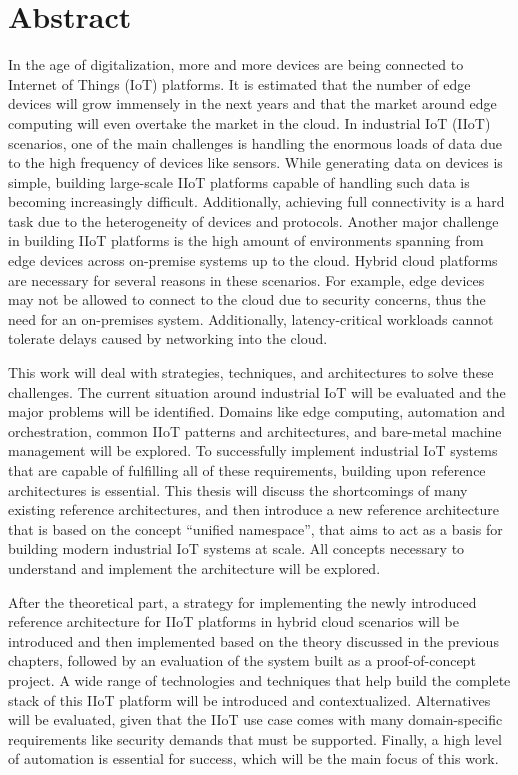 \chapter*{Abstract}

In the age of digitalization, more and more devices are being connected to Internet of Things (IoT) platforms. It is estimated that the number of edge devices will grow immensely in the next years and that the market around edge computing will even overtake the market in the cloud. In industrial IoT (IIoT) scenarios, one of the main challenges is handling the enormous loads of data due to the high frequency of devices like sensors. While generating data on devices is simple, building large-scale IIoT platforms capable of handling such data is becoming increasingly difficult. Additionally, achieving full connectivity is a hard task due to the heterogeneity of devices and protocols. Another major challenge in building IIoT platforms is the high amount of environments spanning from edge devices across on-premise systems up to the cloud. Hybrid cloud platforms are necessary for several reasons in these scenarios. For example, edge devices may not be allowed to connect to the cloud due to security concerns, thus the need for an on-premises system. Additionally, latency-critical workloads cannot tolerate delays caused by networking into the cloud. 

This work will deal with strategies, techniques, and architectures to solve these challenges. The current situation around industrial IoT will be evaluated and the major problems will be identified. Domains like edge computing, automation and orchestration, common IIoT patterns and architectures, and bare-metal machine management will be explored. To successfully implement industrial IoT systems that are capable of fulfilling all of these requirements, building upon reference architectures is essential. This thesis will discuss the shortcomings of many existing reference architectures, and then introduce a new reference architecture that is based on the concept ``unified namespace'', that aims to act as a basis for building modern industrial IoT systems at scale. All concepts necessary to understand and implement the architecture will be explored.

After the theoretical part, a strategy for implementing the newly introduced reference architecture for IIoT platforms in hybrid cloud scenarios will be introduced and then implemented based on the theory discussed in the previous chapters, followed by an evaluation of the system built as a proof-of-concept project. A wide range of technologies and techniques that help build the complete stack of this IIoT platform will be introduced and contextualized. Alternatives will be evaluated, given that the IIoT use case comes with many domain-specific requirements like security demands that must be supported. Finally, a  high level of automation is essential for success, which will be the main focus of this work.